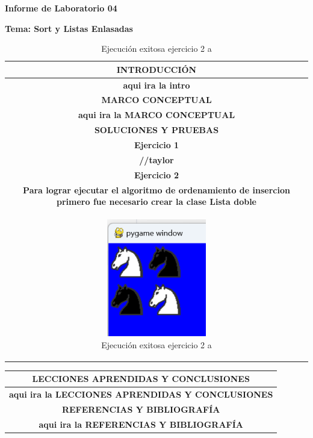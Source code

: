 \documentclass{article}
\newcommand{\itemPracticeNumber}{04}
\newcommand{\itemTheme}{Sort y Listas Enlasadas}
\begin{document}
	
	\vspace*{10px}
	
	\begin{center}	
		\fontsize{17}{17} \textbf{ Informe de Laboratorio \itemPracticeNumber}
	\end{center}
	\centerline{\textbf{\Large Tema: \itemTheme}}

	\begin{table}[H]
		\begin{tabular}{|c|}
			\hline 
			\rowcolor{tablebackground}
			\color{white}\textbf{INTRODUCCIÓN}  \\
			\hline 
			\textbf{aqui ira la intro}  \\
			\hline 
			\rowcolor{tablebackground}
			\color{white}\textbf{MARCO CONCEPTUAL}  \\
			\hline 
			\textbf{aqui ira la MARCO CONCEPTUAL}  \\
			\hline 
			\rowcolor{tablebackground}
			\color{white}\textbf{SOLUCIONES Y PRUEBAS}  \\
			\hline 
			\textbf{Ejercicio 1}  \\
			\textbf{//taylor}  \\
			\textbf{Ejercicio 2}  \\
			\textbf{Para lograr ejecutar el algoritmo de ordenamiento de insercion 
			primero fue necesario crear la clase Lista doble}  \\
			\begin{figure}[H]
				\centering
				\includegraphics[width=0.4\textwidth,keepaspectratio]{img/e2a.png}
				\caption{Ejecución exitosa ejercicio 2 a}
			\end{figure}
			\hline 
		\end{tabular}
	\end{table}
	\begin{table}[H]
		\begin{tabular}{|c|}
			\hline 
			\rowcolor{tablebackground}
			\color{white}\textbf{LECCIONES APRENDIDAS Y CONCLUSIONES}  \\
			\hline 
			\textbf{aqui ira la LECCIONES APRENDIDAS Y CONCLUSIONES}  \\
			\hline 
			\rowcolor{tablebackground}
			\color{white}\textbf{REFERENCIAS Y BIBLIOGRAFÍA}  \\
			\hline 
			\textbf{aqui ira la REFERENCIAS Y BIBLIOGRAFÍA}  \\
			\hline 
		\end{tabular}
	\end{table}
\end{document}
